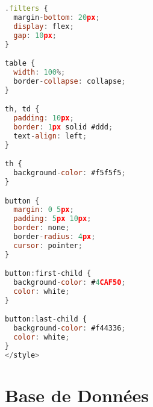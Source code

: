 \documentclass[12pt,a4paper]{report}
\begin{document}
\begin{lstlisting}[language=JavaScript]
.filters {
  margin-bottom: 20px;
  display: flex;
  gap: 10px;
}

table {
  width: 100%;
  border-collapse: collapse;
}

th, td {
  padding: 10px;
  border: 1px solid #ddd;
  text-align: left;
}

th {
  background-color: #f5f5f5;
}

button {
  margin: 0 5px;
  padding: 5px 10px;
  border: none;
  border-radius: 4px;
  cursor: pointer;
}

button:first-child {
  background-color: #4CAF50;
  color: white;
}

button:last-child {
  background-color: #f44336;
  color: white;
}
</style>
\end{lstlisting}

\section{Base de Données}
\end{document}
